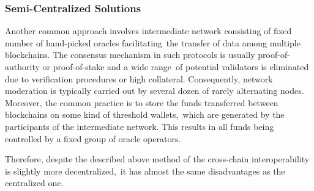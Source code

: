 \subsubsection{Semi-Centralized Solutions}\label{subsubsec:semi-centralized-solutions}

Another common approach involves intermediate network consisting of fixed number of hand-picked oracles facilitating\
the transfer of data among multiple blockchains.
The consensus mechanism in such protocols is usually proof-of-authority or proof-of-stake and a wide range\
of potential validators is eliminated due to verification procedures or high collateral.
Consequently, network moderation is typically carried out by several dozen of rarely alternating nodes.
Moreover, the common practice is to store the funds transferred between blockchains on some kind of threshold wallets,\
which are generated by the participants of the intermediate network.
This results in all funds being controlled by a fixed group of oracle operators.

Therefore, despite the described above method of the cross-chain interoperability is slightly more decentralized,\
it has almost the same disadvantages as the centralized one.
